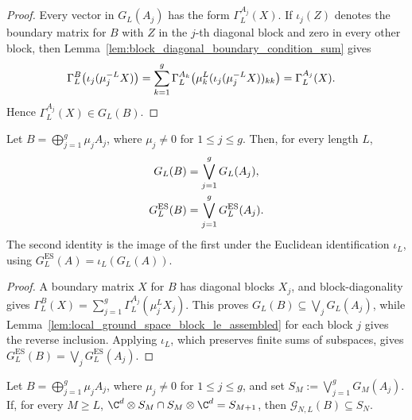 \begin{proof}
    \leanok
    Every vector in $G_L(A_j)$ has the form $\Gamma_L^{A_j}(X)$. If $\iota_j(Z)$
    denotes the boundary matrix for $B$ with $Z$ in the $j$-th diagonal block
    and zero in every other block, then
    Lemma~\ref{lem:block_diagonal_boundary_condition_sum} gives
    \begin{align}
        \Gamma_L^B\!\left(\iota_j(\mu_j^{-L}X)\right)
         & =
        \sum_{k=1}^g
        \Gamma_L^{A_k}
        \!\left(\mu_k^L(\iota_j(\mu_j^{-L}X))_{kk}\right) =\Gamma_L^{A_j}(X).
        \notag
    \end{align}
    Hence $\Gamma_L^{A_j}(X)\in G_L(B)$.
\end{proof}

\begin{lemma}
    \label{thm:block_sum_local_ground_space}
    \leanok
    Let $B=\bigoplus_{j=1}^g\mu_jA_j$, where $\mu_j\ne0$ for
    $1\le j\le g$. Then, for every length $L$,
    \begin{align}
        G_L(B)               & =\bigvee_{j=1}^gG_L(A_j), \notag        \\
        G_L^{\mathrm{ES}}(B) & =\bigvee_{j=1}^gG_L^{\mathrm{ES}}(A_j).
        \notag
    \end{align}
    The second identity is the image of the first under the Euclidean
    identification $\iota_L$, using $G_L^{\mathrm{ES}}(A)=\iota_L(G_L(A))$.
\end{lemma}

\begin{proof}
    \leanok
    A boundary matrix $X$ for $B$ has diagonal blocks $X_j$, and
    block-diagonality gives
    $\Gamma_L^B(X) =\sum_{j=1}^g\Gamma_L^{A_j}(\mu_j^LX_j)$.
    This proves $G_L(B)\subseteq\bigvee_jG_L(A_j)$, while
    Lemma~\ref{lem:local_ground_space_block_le_assembled} for each block $j$
    gives the reverse inclusion.
    Applying $\iota_L$, which preserves finite sums of subspaces, gives
    $G_L^{\mathrm{ES}}(B)=\bigvee_jG_L^{\mathrm{ES}}(A_j)$.
\end{proof}

\begin{lemma}
    \label{lem:block_diagonal_periodic_constraints_propagated_sum}
    \leanok
    Let $B=\bigoplus_{j=1}^g\mu_jA_j$, where $\mu_j\ne0$ for
    $1\le j\le g$, and set $S_M:=\bigvee_{j=1}^gG_M(A_j)$. If, for every
    $M\ge L$,
    $\C^d\otimes S_M\cap S_M\otimes\C^d =S_{M+1}$,
    then $\mathcal G_{N,L}(B)\subseteq S_N$.
\end{lemma}


